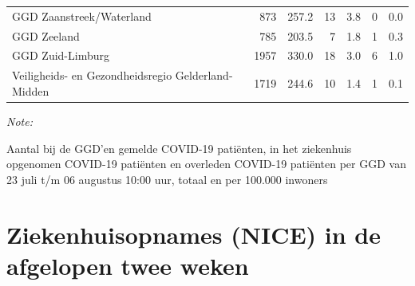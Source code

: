 \documentclass[
  english,
  man,floatsintext]{apa6}
\begin{document}
\begin{table}
\begin{threeparttable}
\begin{tabular}{lrrrrrr}
GGD Zaanstreek/Waterland & 873 & 257.2 & 13 & 3.8 & 0 & 0.0\\
GGD Zeeland & 785 & 203.5 & 7 & 1.8 & 1 & 0.3\\
GGD Zuid-Limburg & 1957 & 330.0 & 18 & 3.0 & 6 & 1.0\\
Veiligheids- en Gezondheidsregio Gelderland-Midden & 1719 & 244.6 & 10 & 1.4 & 1 & 0.1\\
\bottomrule
\end{tabular}
\begin{tablenotes}
\item \textit{Note: } 
\item Aantal bij de GGD’en gemelde COVID-19 patiënten, in het ziekenhuis opgenomen COVID-19 patiënten en overleden COVID-19 patiënten per GGD van 23 juli t/m 06 augustus 10:00 uur, totaal en per 100.000 inwoners
\end{tablenotes}
\end{threeparttable}
\endgroup{}
\end{table}

\newpage

\hypertarget{ziekenhuisopnames-nice-in-de-afgelopen-twee-weken}{%
\section{Ziekenhuisopnames (NICE) in de afgelopen twee weken}\label{ziekenhuisopnames-nice-in-de-afgelopen-twee-weken}}
\end{document}
